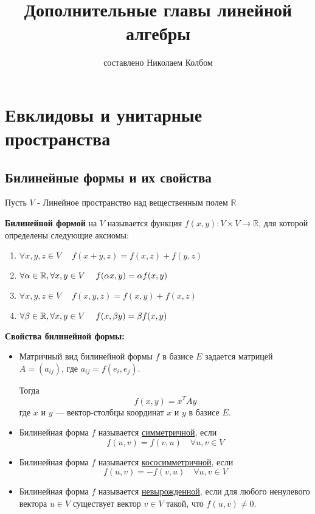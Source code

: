 \documentclass[12px]{report}
\title{Дополнительные главы линейной алгебры}
\author{составлено Николаем Колбом}
\begin{document}
  \maketitle
  \tableofcontents

  \chapter{Евклидовы и унитарные пространства}

  \section{Билинейные формы и их свойства}

\large Пусть $V$ - Линейное пространство над вещественным полем $\mathbb{R}$

\vspace{0.5cm}


\begin{shdef}
    \begin{definition}
        \leavevmode\newline
        
        \textbf{Билинейной формой} на $V$ называется функция $f(x,y): V \times V \to \mathbb{R}$, для которой определены следующие аксиомы:
        \begin{enumerate}
            \item $\forall x,y,z \in V \quad \; f(x+y,z) = f(x, z) + f(y,z)$
            \item $\forall \alpha \in \mathbb{R}, \forall x,y \in V \quad \;  f(\alpha x, y) = \alpha f(x,y)$
            \item $\forall x, y, z \in V \quad \; f(x,y,z) = f(x,y) + f(x,z)$
            \item $\forall \beta \in \mathbb{R}, \forall x, y \in V \quad \; f(x, \beta y) = \beta f(x,y)$
        \end{enumerate}
    \end{definition}
\end{shdef}

\vspace{0.5cm}
\textbf{Свойства билинейной формы:}

\begin{itemize}
    \item Матричный вид билинейной формы $f$ в базисе $E$ задается матрицей $A = (a_{ij})$, где $a_{ij} = f(e_i, e_j)$. 

    Тогда
    \[
    f(x, y) = x^T A y
    \]
    где $x$ и $y$ — вектор-столбцы координат $x$ и $y$ в базисе $E$.
    \item Билинейная форма $f$ называется \underline{симметричной}, если
    \[
    f(u, v) = f(v, u) \quad \forall u, v \in V
    \]
    \item Билинейная форма $f$ называется \underline{кососимметричной}, если
    \[
    f(u, v) = -f(v, u) \quad \forall u, v \in V
    \]
    \item Билинейная форма $f$ называется \underline{невырожденной}, если для любого \newline ненулевого вектора $u \in V$ существует вектор $v \in V$ такой, что $f(u, v) \neq 0$.
\end{itemize}
\end{document}
